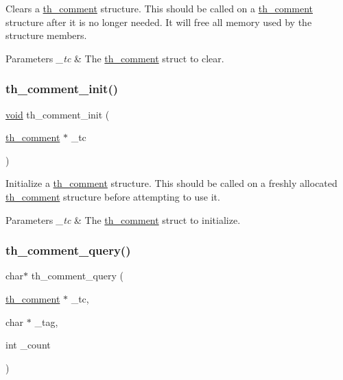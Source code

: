 Clears a \hyperlink{structth__comment}{th\+\_\+comment} structure. This should be called on a \hyperlink{structth__comment}{th\+\_\+comment} structure after it is no longer needed. It will free all memory used by the structure members. 
\begin{DoxyParams}{Parameters}
{\em \+\_\+tc} & The \hyperlink{structth__comment}{th\+\_\+comment} struct to clear. \\
\hline
\end{DoxyParams}
\mbox{\label{group__basefuncs_ga6c8ab25988e7ea9d7b1e31a54cf58f09}} 
\subsubsection{\texorpdfstring{th\+\_\+comment\+\_\+init()}{th\_comment\_init()}}
{\footnotesize\ttfamily \hyperlink{png_8h_ac9c84fa68bbad002983e35ce3663c686}{void} th\+\_\+comment\+\_\+init (\begin{DoxyParamCaption}\item[{\hyperlink{structth__comment}{th\+\_\+comment} $\ast$}]{\+\_\+tc }\end{DoxyParamCaption})}

Initialize a \hyperlink{structth__comment}{th\+\_\+comment} structure. This should be called on a freshly allocated \hyperlink{structth__comment}{th\+\_\+comment} structure before attempting to use it. 
\begin{DoxyParams}{Parameters}
{\em \+\_\+tc} & The \hyperlink{structth__comment}{th\+\_\+comment} struct to initialize. \\
\hline
\end{DoxyParams}
\mbox{\label{group__basefuncs_ga33c8b4f57a03217636d704c2ebb211fa}} 
\subsubsection{\texorpdfstring{th\+\_\+comment\+\_\+query()}{th\_comment\_query()}}
{\footnotesize\ttfamily char$\ast$ th\+\_\+comment\+\_\+query (\begin{DoxyParamCaption}\item[{\hyperlink{structth__comment}{th\+\_\+comment} $\ast$}]{\+\_\+tc,  }\item[{char $\ast$}]{\+\_\+tag,  }\item[{int}]{\+\_\+count }\end{DoxyParamCaption})}

